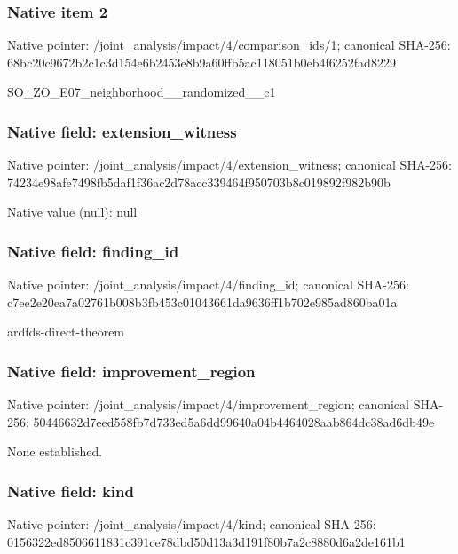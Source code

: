 \documentclass[10pt,a4paper]{article}
\begin{document}
\subsubsection{Native item 2}
Native pointer: /joint\_\allowbreak{}analysis/impact/4/comparison\_\allowbreak{}ids/1; canonical SHA-256: 68bc20c9672b2c1c3d154e6b2453e8b9a60ffb5ac118051b0eb4f6252fad8229

\begingroup\raggedright\sloppy SO\_\allowbreak{}ZO\_\allowbreak{}E07\_\allowbreak{}neighborhood\_\allowbreak{}\_\allowbreak{}randomized\_\allowbreak{}\_\allowbreak{}c1\par\endgroup

\subsubsection{Native field: extension\_\allowbreak{}witness}
Native pointer: /joint\_\allowbreak{}analysis/impact/4/extension\_\allowbreak{}witness; canonical SHA-256: 74234e98afe7498fb5daf1f36ac2d78acc339464f950703b8c019892f982b90b

Native value (null): null

\subsubsection{Native field: finding\_\allowbreak{}id}
Native pointer: /joint\_\allowbreak{}analysis/impact/4/finding\_\allowbreak{}id; canonical SHA-256: c7ee2e20ea7a02761b008b3fb453c01043661da9636ff1b702e985ad860ba01a

\begingroup\raggedright\sloppy ardfds-direct-theorem\par\endgroup

\subsubsection{Native field: improvement\_\allowbreak{}region}
Native pointer: /joint\_\allowbreak{}analysis/impact/4/improvement\_\allowbreak{}region; canonical SHA-256: 50446632d7eed558fb7d733ed5a6dd99640a04b4464028aab864dc38ad6db49e

\begingroup\raggedright\sloppy None established.\par\endgroup

\subsubsection{Native field: kind}
Native pointer: /joint\_\allowbreak{}analysis/impact/4/kind; canonical SHA-256: 0156322ed8506611831c391ce78dbd50d13a3d191f80b7a2c8880d6a2de161b1
\end{document}

